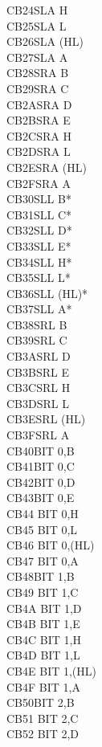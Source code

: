 \documentclass[oneside,a4paper]{book}
\begin{document}
\begin{multicols}{3}
{\begin{tabbing}
CB24\>SLA H\\
CB25\>SLA L\\
CB26\>SLA (HL)\\
CB27\>SLA A\\
CB28\>SRA B\\
CB29\>SRA C\\
CB2A\>SRA D\\
CB2B\>SRA E\\
CB2C\>SRA H\\
CB2D\>SRA L\\
CB2E\>SRA (HL)\\
CB2F\>SRA A\\
CB30\>SLL B*\\
CB31\>SLL C*\\
CB32\>SLL D*\\
CB33\>SLL E*\\
CB34\>SLL H*\\
CB35\>SLL L*\\
CB36\>SLL (HL)*\\
CB37\>SLL A*\\
CB38\>SRL B\\
CB39\>SRL C\\
CB3A\>SRL D\\
CB3B\>SRL E\\
CB3C\>SRL H\\
CB3D\>SRL L\\
CB3E\>SRL (HL)\\
CB3F\>SRL A\\
CB40\>BIT 0,B\\
CB41\>BIT 0,C\\
CB42\>BIT 0,D\\
CB43\>BIT 0,E\\
CB44\> 	BIT 0,H\\
CB45\> 	BIT 0,L\\
CB46\> 	BIT 0,(HL)\\
CB47\> 	BIT 0,A\\
CB48\>BIT 1,B\\
CB49\> 	BIT 1,C\\
CB4A\> 	BIT 1,D\\
CB4B\> 	BIT 1,E\\
CB4C\> 	BIT 1,H\\
CB4D\> 	BIT 1,L\\
CB4E\> 	BIT 1,(HL)\\
CB4F\> 	BIT 1,A\\
CB50\>BIT 2,B\\
CB51\> 	BIT 2,C\\
CB52\> 	BIT 2,D\\

\end{tabbing}}
\end{multicols}
\end{document}
